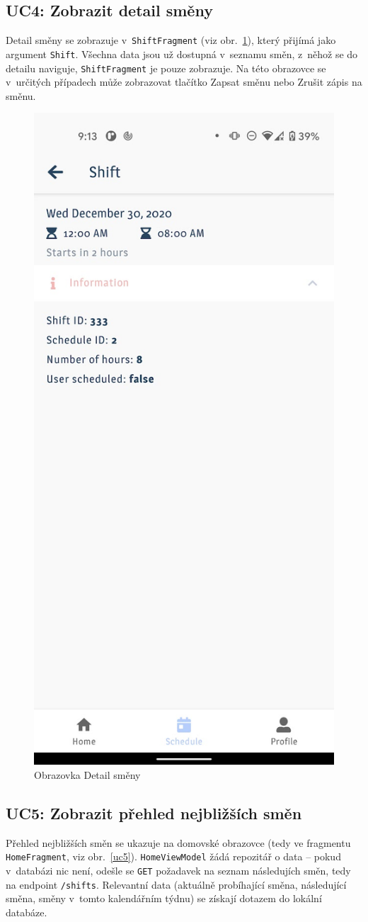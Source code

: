 \documentclass[twoside]{ctuthesis}
\begin{document}
\subsection{UC4: Zobrazit detail směny}

Detail směny se zobrazuje v~\texttt{ShiftFragment} (viz obr.~\ref{uc4}), který přijímá jako argument \texttt{Shift}. Všechna data jsou už dostupná v~seznamu směn, z~něhož se do detailu naviguje, \texttt{ShiftFragment} je pouze zobrazuje. Na této obrazovce se v~určitých případech může zobrazovat tlačítko Zapsat směnu nebo Zrušit zápis na směnu.

\begin{figure}[ht]
	\includegraphics[width=.45\linewidth]{img/uc4.jpg}
	\caption{Obrazovka Detail směny}
	\label{uc4}
\end{figure}
\newpage

\subsection{UC5: Zobrazit přehled nejbližších směn}

Přehled nejbližších směn se ukazuje na domovské obrazovce (tedy ve fragmentu \texttt{HomeFragment}, viz obr.~\ref{uc5}). \texttt{HomeViewModel} žádá repozitář o data -- pokud v~databázi nic není, odešle se \texttt{GET} požadavek na seznam následujích směn, tedy na endpoint \texttt{/shifts}. Relevantní data (aktuálně probíhající směna, následující směna, směny v~tomto kalendářním týdnu) se získají dotazem do lokální databáze.
\end{document}

